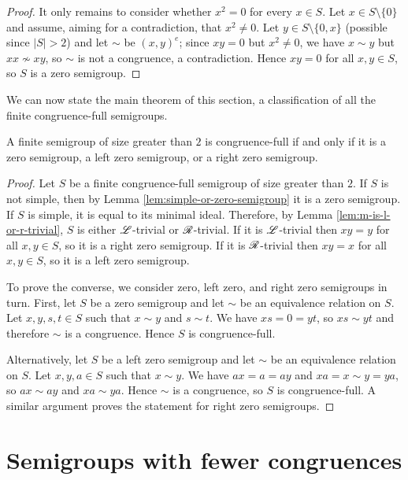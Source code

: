 \begin{lemma}
\begin{proof}
    It only remains to consider whether $x^2=0$ for every $x \in S$.  Let
    $x \in S \setminus \{0\}$ and assume, aiming for a contradiction, that
    $x^2 \neq 0$.  Let $y \in S \setminus \{0,x\}$ (possible since $|S| > 2$)
    and let $\sim$ be $(x,y)^e$; since $xy=0$ but $x^2 \neq 0$, we have
    $x \sim y$ but $xx \nsim xy$, so $\sim$ is not a congruence, a
    contradiction.  Hence $xy = 0$ for all $x,y \in S$, so $S$ is a zero
    semigroup.
  \end{proof}
\end{lemma}

We can now state the main theorem of this section, a classification of all the
finite congruence-full semigroups.

\begin{theorem}
  \label{thm:congruence-full}
  A finite semigroup of size greater than $2$ is congruence-full if and only if
  it is a zero semigroup, a left zero semigroup, or a right zero semigroup.
  \begin{proof}
    Let $S$ be a finite congruence-full semigroup of size greater than $2$.  If
    $S$ is not simple, then by Lemma \ref{lem:simple-or-zero-semigroup} it is a
    zero semigroup.  If $S$ is simple, it is equal to its minimal ideal.
    Therefore, by Lemma \ref{lem:m-is-l-or-r-trivial}, $S$ is either
    $\mathrel{\mathscr{L}}$-trivial or $\mathrel{\mathscr{R}}$-trivial.  If it is $\mathrel{\mathscr{L}}$-trivial then $xy=y$ for all
    $x,y \in S$, so it is a right zero semigroup.  If it is $\mathrel{\mathscr{R}}$-trivial then
    $xy=x$ for all $x,y \in S$, so it is a left zero semigroup.

    To prove the converse, we consider zero, left zero, and right zero
    semigroups in turn.  First, let $S$ be a zero semigroup and let $\sim$ be an
    equivalence relation on $S$.  Let $x,y,s,t \in S$ such that $x \sim y$ and
    $s \sim t$.  We have $xs = 0 = yt$, so $xs \sim yt$ and therefore $\sim$ is
    a congruence.  Hence $S$ is congruence-full.

    Alternatively, let $S$ be a left zero semigroup and let $\sim$ be an
    equivalence relation on $S$.  Let $x,y,a \in S$ such that $x \sim y$.  We
    have $ax = a = ay$ and $xa = x \sim y = ya$, so $ax \sim ay$ and
    $xa \sim ya$.  Hence $\sim$ is a congruence, so $S$ is congruence-full.
    A similar argument proves the statement for right zero semigroups.
  \end{proof}
\end{theorem}



\section{Semigroups with fewer congruences}

